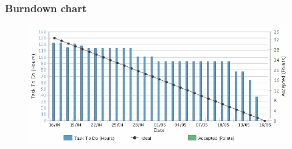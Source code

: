 \subsubsection{Burndown chart}
\begin{figure}[ht]
\includegraphics[width=\textwidth]{./imgs/burndown.png}
\end{figure}
